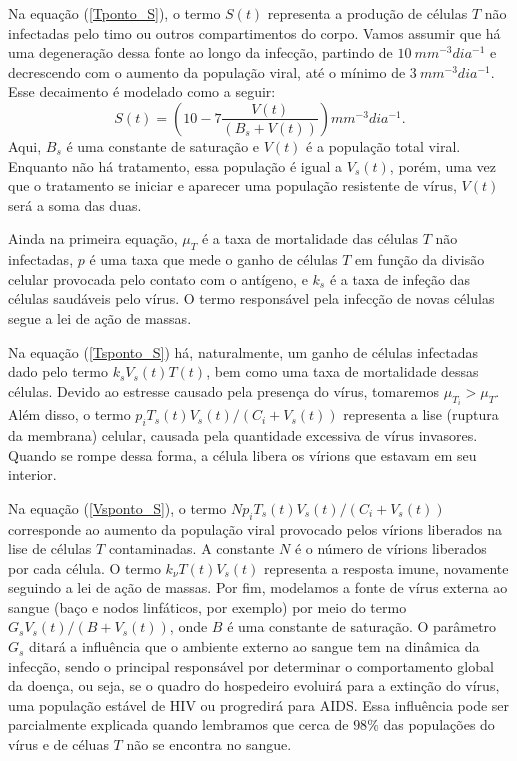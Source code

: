 Na equação (\ref{Tponto_S}), o termo \( S ( t ) \) representa a produção de células \( T \) não infectadas pelo timo ou outros compartimentos do corpo.
Vamos assumir que há uma degeneração dessa fonte ao longo da infecção, partindo de \( 10 \ \unit{mm^{ -3 } dia^{ -1 }} \) e decrescendo com o aumento da população viral, até o mínimo de \( 3 \ \unit{mm^{ -3 } dia^{ -1 }} \).
Esse decaimento é modelado como a seguir:
\begin{equation}
    S ( t ) = \left(
        10  - 7 \frac{ V ( t ) }{ ( B_{ s } + V ( t ) ) } 
    \right)
    \unit{mm^{ -3 } dia^{ -1 }}
.\end{equation}
Aqui, \( B_{ s } \) é uma constante de saturação e \( V ( t ) \) é a população total viral.
Enquanto não há tratamento, essa população é igual a \( V_{ s } ( t ) \), porém, uma vez que o tratamento se iniciar e aparecer uma população resistente de vírus, \( V ( t ) \) será a soma das duas.

Ainda na primeira equação, \( \mu_{ T } \) é a taxa de mortalidade das células \( T \) não infectadas, \( p \) é uma taxa que mede o ganho de células \( T \) em função da divisão celular provocada pelo contato com o antígeno, e \( k_{ s } \) é a taxa de infeção das células saudáveis pelo vírus.
O termo responsável pela infecção de novas células segue a lei de ação de massas.

Na equação (\ref{Tsponto_S}) há, naturalmente, um ganho de células infectadas dado pelo termo \( k_{ s } V_{ s } ( t ) T ( t ) \), bem como uma taxa de mortalidade dessas células.
Devido ao estresse causado pela presença do vírus, tomaremos \( \mu_{ T_{ i } } > \mu_{ T } \).
Além disso, o termo \( p_{ i } T_{ s } ( t ) V_{ s } ( t ) / ( C_{ i } + V_{ s } ( t ) ) \) representa a lise (ruptura da membrana) celular, causada pela quantidade excessiva de vírus invasores.
Quando se rompe dessa forma, a célula libera os vírions que estavam em seu interior.

Na equação (\ref{Vsponto_S}), o termo \( N p_{ i } T_{ s } ( t ) V_{ s } ( t ) / ( C_{ i } + V_{ s } ( t ) ) \) corresponde ao aumento da população viral provocado pelos vírions liberados na lise de células \( T \) contaminadas.
A constante \( N \) é o número de vírions liberados por cada célula.
O termo \( k_{ \nu } T ( t ) V_{ s } ( t ) \) representa a resposta imune, novamente seguindo a lei de ação de massas.
Por fim, modelamos a fonte de vírus externa ao sangue (baço e nodos linfáticos, por exemplo) por meio do termo \( G_{ s } V_{ s } ( t ) / ( B + V_{ s } ( t ) ) \), onde \( B \) é uma constante de saturação.
O parâmetro \( G_{ s } \) ditará a influência que o ambiente externo ao sangue tem na dinâmica da infecção, sendo o principal responsável por determinar o comportamento global da doença, ou seja, se o quadro do hospedeiro evoluirá para a extinção do vírus, uma população estável de HIV ou progredirá para AIDS.
Essa influência pode ser parcialmente explicada quando lembramos que cerca de \( 98 \% \) das populações do vírus e de céluas \( T \) não se encontra no sangue.
